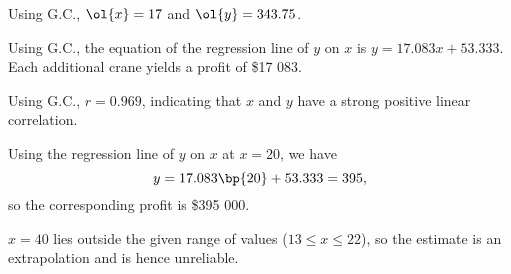 \begin{solution}
    \begin{ppart}
        \begin{figure}[H]
            \centering
        \end{figure}
    \end{ppart}
    \begin{ppart}
        Using G.C., $\ol{x} = 17$ and $\ol{y} = 343.75$.
    \end{ppart}
    \begin{ppart}
        Using G.C., the equation of the regression line of $y$ on $x$ is $y = 17.083x + 53.333$. Each additional crane yields a profit of \$17 083.
    \end{ppart}
    \begin{ppart}
        Using G.C., $r = 0.969$, indicating that $x$ and $y$ have a strong positive linear correlation.
    \end{ppart}
    \begin{ppart}
        Using the regression line of $y$ on $x$ at $x = 20$, we have \[y = 17.083\bp{20} + 53.333 = 395,\] so the corresponding profit is \$395 000.
    \end{ppart}
    \begin{ppart}
        $x = 40$ lies outside the given range of values ($13 \leq x \leq 22$), so the estimate is an extrapolation and is hence unreliable.
    \end{ppart}
\end{solution}

